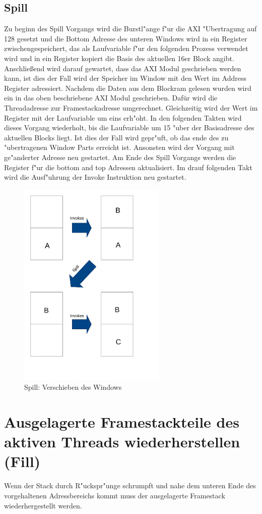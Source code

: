 \subsection{Spill}
Zu beginn des Spill Vorgangs wird die Burstl"ange f"ur die AXI "Ubertragung auf 128 gesetzt und die Bottom Adresse des unteren Windows wird in ein Register zwischengespeichert, das als Laufvariable f"ur den folgenden Prozess verwendet wird und in ein Register kopiert die Basis des aktuellen 16er Block angibt. 
Anschlie{\ss}end wird darauf gewartet, dass das AXI Modul geschrieben werden kann, ist dies der Fall wird der Speicher im Window mit den Wert im Address Register adressiert. 
Nachdem die Daten aus dem Blockram gelesen wurden wird ein in das oben beschriebene AXI Modul geschrieben. Dafür wird die Threadadresse zur Framestackadresse umgerechnet. Gleichzeitig wird der Wert im Register mit der Laufvariable um eins erh"oht.  In den folgenden Takten wird dieses Vorgang wiederholt, bis die Laufvariable um 15 "uber der Basisadresse des aktuellen Blocks liegt. Ist dies der Fall wird gepr"uft, ob das ende des zu "ubertragenen Window Parts erreicht ist. Ansonsten wird der Vorgang mit ge"anderter Adresse neu gestartet. 
Am Ende des Spill Vorgangs werden die Register f"ur die bottom and top Adressen aktualisiert. Im drauf folgenden Takt wird die Ausf"uhrung der Invoke Instruktion neu gestartet.
\begin{figure}
	\centering
	\includegraphics[height = 10cm]{PS_RS_graphics/spill.pdf}
	\caption{Spill: Verschieben des Windows }
\end{figure}

\section{Ausgelagerte Framestackteile des aktiven Threads wiederherstellen (Fill)}
Wenn der Stack durch R"uckspr"unge schrumpft und nahe dem unteren Ende des vorgehaltenen Adressbereichs kommt muss der ausgelagerte Framestack wiederhergestellt werden. 


